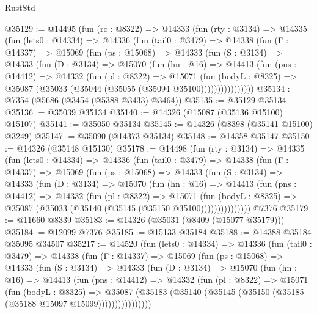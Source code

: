 \begin{lexlean}{RustStd}
\begin{coremodule}
@35129 := @14495
    (fun (rc : @8322) =>
    @14333
      (fun (rty : @3134) =>
      @14335
        (fun (lets0 : @14334) =>
        @14336
          (fun (tail0 : @3479) =>
          @14338
            (fun (Γ : @14337) =>
            @15069
              (fun (ps : @15068) =>
              @14333
                (fun (S : @3134) =>
                @14333
                  (fun (D : @3134) =>
                  @15070
                    (fun (hn : @16) =>
                    @14413
                      (fun (pns : @14412) =>
                      @14332
                        (fun (pl : @8322) =>
                        @15071
                          (fun (bodyL : @8325) =>
                          @35087 (@35033 (@35044 (@35055 (@35094 @35100))))))))))))))))
@35134 := @7354 (@5686 (@3454 (@5388 @3433) @3464))
@35135 := @35129 @35134
@35136 := @35039 @35134
@35140 := @14326 (@15087 (@35136 @15100) @15107)
@35141 := @35050 @35134
@35145 := @14326 (@8398 (@35141 @15100) @3249)
@35147 := @35090 (@14373 @35134)
@35148 := @14358 @35147
@35150 := @14326 (@35148 @15130)
@35178 := @14498
    (fun (rty : @3134) =>
    @14335
      (fun (lets0 : @14334) =>
      @14336
        (fun (tail0 : @3479) =>
        @14338
          (fun (Γ : @14337) =>
          @15069
            (fun (ps : @15068) =>
            @14333
              (fun (S : @3134) =>
              @14333
                (fun (D : @3134) =>
                @15070
                  (fun (hn : @16) =>
                  @14413
                    (fun (pns : @14412) =>
                    @14332
                      (fun (pl : @8322) =>
                      @15071
                        (fun (bodyL : @8325) =>
                        @35087 (@35033 (@35140 (@35145 (@35150 @35100)))))))))))))))
    @7376
@35179 := @11660 @8339
@35183 := @14326 (@35031 (@8409 (@15077 @35179)))
@35184 := @12099 @7376
@35185 := @15133 @35184
@35188 := @14388 @35184 @35095 @34507
@35217 := @14520
    (fun (lets0 : @14334) =>
    @14336
      (fun (tail0 : @3479) =>
      @14338
        (fun (Γ : @14337) =>
        @15069
          (fun (ps : @15068) =>
          @14333
            (fun (S : @3134) =>
            @14333
              (fun (D : @3134) =>
              @15070
                (fun (hn : @16) =>
                @14413
                  (fun (pns : @14412) =>
                  @14332
                    (fun (pl : @8322) =>
                    @15071
                      (fun (bodyL : @8325) =>
                      @35087
                        (@35183
                          (@35140 (@35145 (@35150 (@35185 (@35188 @15097 @15099))))))))))))))))

\end{coremodule}
\end{lexlean}
